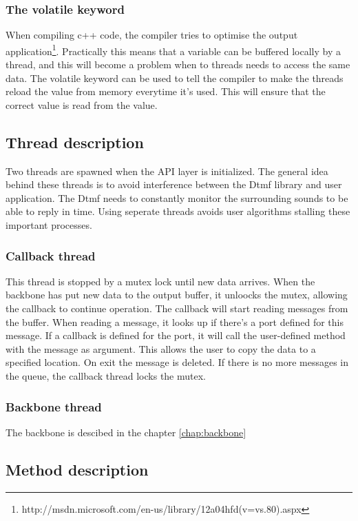 \subsubsection{The volatile keyword}
When compiling c++ code, the compiler tries to optimise the output application\footnote{http://msdn.microsoft.com/en-us/library/12a04hfd(v=vs.80).aspx}. Practically this means that a variable can be buffered locally by a thread, and this will become a problem when to threads needs to access the same data. The volatile keyword can be used to tell the compiler to make the threads reload the value from memory everytime it's used. This will ensure that the correct value is read from the value.

\subsection{Thread description}
\label{api_thread_description}
Two threads are spawned when the API layer is initialized. The general idea behind these threads is to avoid interference between the Dtmf library and user application. The Dtmf needs to constantly monitor the surrounding sounds to be able to reply in time. Using seperate threads avoids user algorithms stalling these important processes.

\subsubsection{Callback thread}
This thread is stopped by a mutex lock until new data arrives. When the backbone has put new data to the output buffer, it unloocks the mutex, allowing the callback to continue operation. The callback will start reading messages from the buffer. When reading a message, it looks up if there's a port defined for this message. If a callback is defined for the port, it will call the user-defined method with the message as argument. This allows the user to copy the data to a specified location. On exit the message is deleted. If there is no more messages in the queue, the callback thread locks the mutex.

\subsubsection{Backbone thread}
The backbone is descibed in the chapter \ref{chap:backbone}

\subsection{Method description}
\label{sub:api_method_description}
